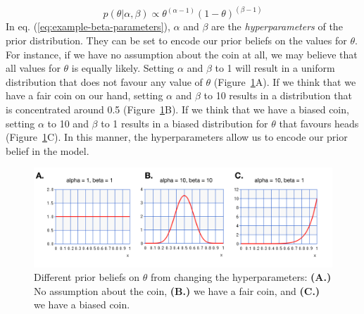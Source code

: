 \begin{equation}
p(\theta \vert \alpha,\beta) \propto \theta^{(\alpha-1)}(1-\theta)^{(\beta-1)}
\label{eq:example-beta-parameters}
\end{equation}
In eq. (\ref{eq:example-beta-parameters}), $\alpha$ and $\beta$ are the \emph{hyperparameters} of the prior distribution. They can be set to encode our prior beliefs on the values for $\theta$. For instance, if we have no assumption about the coin at all, we may believe that all values for $\theta$ is equally likely. Setting $\alpha$ and $\beta$ to 1 will result in a uniform distribution that does not favour any value of $\theta$ (Figure~\ref{fig:beta-prior}A). If we think that we have a fair coin on our hand, setting $\alpha$ and $\beta$ to 10 results in a distribution that is concentrated around 0.5 (Figure~\ref{fig:beta-prior}B). If we think that we have a biased coin, setting $\alpha$ to 10 and $\beta$ to 1 results in a biased distribution for $\theta$ that favours heads (Figure~\ref{fig:beta-prior}C). In this manner, the hyperparameters allow us to encode our prior belief in the model. 
\begin{figure}
\noindent \begin{centering}
\includegraphics[width=1.0\textwidth]{03-machine-learning/figures/beta_prior.pdf}
\par\end{centering}
\caption{\label{fig:beta-prior}Different prior beliefs on $\theta$ from changing the hyperparameters: \textbf{(A.)} No assumption about the coin, \textbf{(B.)} we have a fair coin, and \textbf{(C.)} we have a biased coin.}
\end{figure}

